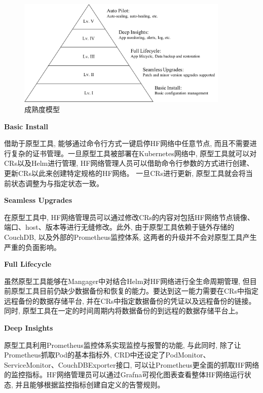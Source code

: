 \begin{figure}[h] %
    \centering %
    \includegraphics[width=0.9\textwidth]{FIGs/chapter5/maturity.pdf} %
    \caption{成熟度模型} %
    \label{maturity} %
\end{figure}%

\textbf{Basic Install}

借助于原型工具, 能够通过命令行方式一键启停HF网络中任意节点, 而且不需要进行复杂的证书管理。一旦原型工具被部署在Kubernetes网络中, 原型工具就可以对CRs以及Helm进行管理, HF网络管理人员可以借助命令行参数的方式进行创建、更新CRs以此来创建特定规格的HF网络。 一旦CRs进行更新, 原型工具就会将当前状态调整为与指定状态一致。

\textbf{Seamless Upgrades}

在原型工具中, HF网络管理员可以通过修改CRs的内容对包括HF网络节点镜像、端口、host、版本等进行无缝修改。此外, 由于原型工具依赖于链外存储的CouchDB, 以及外部的Prometheus监控体系, 这两者的升级并不会对原型工具产生严重的负面影响。 

\textbf{Full Lifecycle}

虽然原型工具能够在Mangager中对结合Helm对HF网络进行全生命周期管理, 但目前原型工具目前仍缺少数据备份和恢复的能力。要达到这一能力需要在CRs中指定远程备份的数据存储平台, 并在CRs中指定数据备份的凭证以及远程备份的链接。同时, 原型工具在一定的时间周期内将数据备份的到远程的数据存储平台上。

\textbf{Deep Insights}

原型工具利用Prometheus监控体系实现监控与报警的功能, 与此同时, 除了让Prometheus抓取Pod的基本指标外, CRD中还设定了PodMonitor、ServiceMonitor、CouchDBExporter接口, 可以让Prometheus更全面的抓取HF网络的监控指标。HF网络管理员可以通过Grafna可视化图表查看整体HF网络运行状态, 并且能够根据监控指标创建自定义的告警规则。

